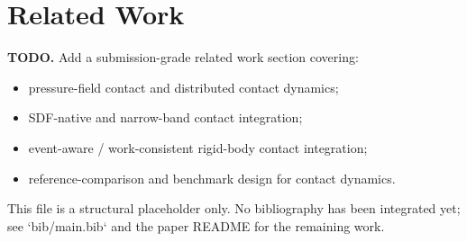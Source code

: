 \section{Related Work}
\noindent\textbf{TODO.} Add a submission-grade related work section covering:

\begin{itemize}
    \item pressure-field contact and distributed contact dynamics;
    \item SDF-native and narrow-band contact integration;
    \item event-aware / work-consistent rigid-body contact integration;
    \item reference-comparison and benchmark design for contact dynamics.
\end{itemize}

\noindent This file is a structural placeholder only. No bibliography has been integrated yet; see `bib/main.bib` and the paper README for the remaining work.

